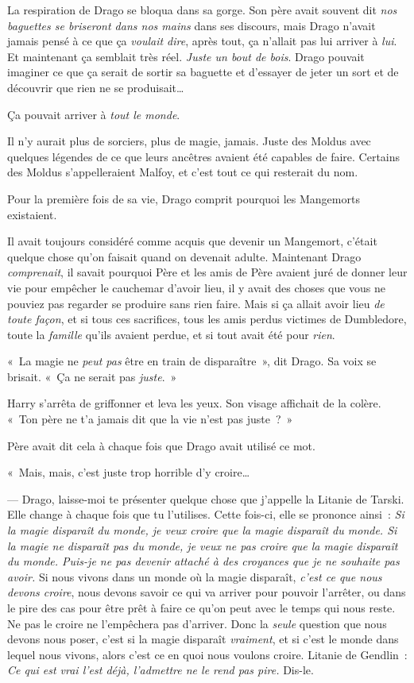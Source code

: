 La respiration de Drago se bloqua dans sa gorge.
Son père avait souvent dit \emph{nos baguettes se briseront dans nos mains} dans ses discours, mais Drago n'avait jamais pensé à ce que ça \emph{voulait dire}, après tout, ça n'allait pas lui arriver à \emph{lui}.
Et maintenant ça semblait très réel.
\emph{Juste un bout de bois}.
Drago pouvait imaginer ce que ça serait de sortir sa baguette et d'essayer de jeter un sort et de découvrir que rien ne se produisait…

Ça pouvait arriver à \emph{tout le monde}.

Il n'y aurait plus de sorciers, plus de magie, jamais.
Juste des Moldus avec quelques légendes de ce que leurs ancêtres avaient été capables de faire.
Certains des Moldus s'appelleraient Malfoy, et c'est tout ce qui resterait du nom.

Pour la première fois de sa vie, Drago comprit pourquoi les Mangemorts existaient.

Il avait toujours considéré comme acquis que devenir un Mangemort, c'était quelque chose qu'on faisait quand on devenait adulte.
Maintenant Drago \emph{comprenait}, il savait pourquoi Père et les amis de Père avaient juré de donner leur vie pour empêcher le cauchemar d'avoir lieu, il y avait des choses que vous ne pouviez pas regarder se produire sans rien faire.
Mais si ça allait avoir lieu \emph{de toute façon}, et si tous ces sacrifices, tous les amis perdus victimes de Dumbledore, toute la \emph{famille} qu'ils avaient perdue, et si tout avait été pour \emph{rien}.

«~La magie ne \emph{peut pas} être en train de disparaître~», dit Drago.
Sa voix se brisait.
«~Ça ne serait pas \emph{juste}.~»

Harry s'arrêta de griffonner et leva les yeux.
Son visage affichait de la colère.
«~Ton père ne t'a jamais dit que la vie n'est pas juste~?~»

Père avait dit cela à chaque fois que Drago avait utilisé ce mot.

«~Mais, mais, c'est juste trop horrible d'y croire…

--- Drago, laisse-moi te présenter quelque chose que j'appelle la Litanie de Tarski.
Elle change à chaque fois que tu l'utilises.
Cette fois-ci, elle se prononce ainsi~: \emph{Si la magie disparaît du monde, je veux croire que la magie disparaît du monde.
Si la magie ne disparaît pas du monde, je veux ne pas croire que la magie disparaît du monde.
Puis-je ne pas devenir attaché à des croyances que je ne souhaite pas avoir.} Si nous vivons dans un monde où la magie disparaît, \emph{c'est ce que nous devons croire}, nous devons savoir ce qui va arriver pour pouvoir l'arrêter, ou dans le pire des cas pour être prêt à faire ce qu'on peut avec le temps qui nous reste.
Ne pas le croire ne l'empêchera pas d'arriver.
Donc la \emph{seule} question que nous devons nous poser, c'est si la magie disparaît \emph{vraiment}, et si c'est le monde dans lequel nous vivons, alors c'est ce en quoi nous voulons croire.
Litanie de Gendlin~: \emph{Ce qui est vrai l'est déjà, l'admettre ne le rend pas pire.} Dis-le.

